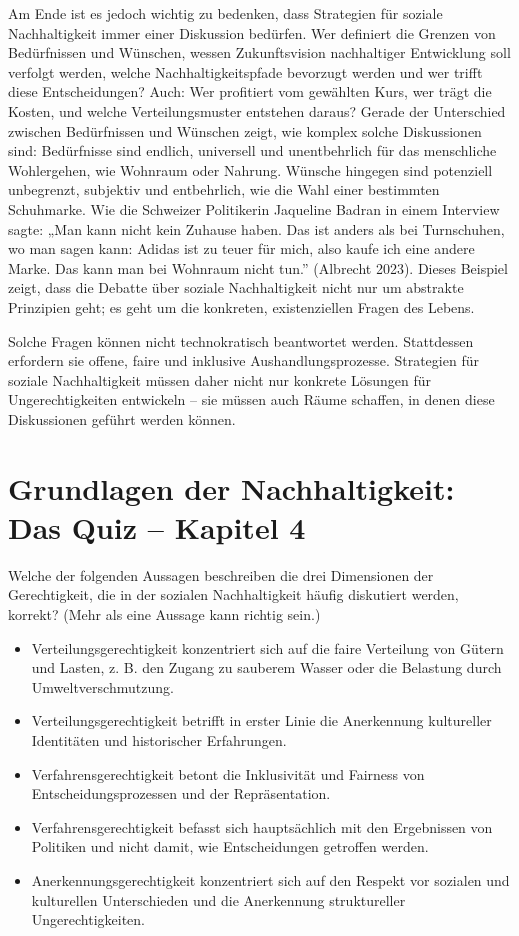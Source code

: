 \documentclass[
  nswissgerman,
  a4paper,
  openany]{book}
\providecommand{\tightlist}{%
  \setlength{\itemsep}{0pt}\setlength{\parskip}{0pt}}
\begin{document}
Am Ende ist es jedoch wichtig zu bedenken, dass Strategien für soziale
Nachhaltigkeit immer einer Diskussion bedürfen. Wer definiert die
Grenzen von Bedürfnissen und Wünschen, wessen Zukunftsvision
nachhaltiger Entwicklung soll verfolgt werden, welche
Nachhaltigkeitspfade bevorzugt werden und wer trifft diese
Entscheidungen? Auch: Wer profitiert vom gewählten Kurs, wer trägt die
Kosten, und welche Verteilungsmuster entstehen daraus? Gerade der
Unterschied zwischen Bedürfnissen und Wünschen zeigt, wie komplex solche
Diskussionen sind: Bedürfnisse sind endlich, universell und
unentbehrlich für das menschliche Wohlergehen, wie Wohnraum oder
Nahrung. Wünsche hingegen sind potenziell unbegrenzt, subjektiv und
entbehrlich, wie die Wahl einer bestimmten Schuhmarke. Wie die Schweizer
Politikerin Jaqueline Badran in einem Interview sagte: „Man kann nicht
kein Zuhause haben. Das ist anders als bei Turnschuhen, wo man sagen
kann: Adidas ist zu teuer für mich, also kaufe ich eine andere Marke.
Das kann man bei Wohnraum nicht tun.'' (Albrecht 2023). Dieses Beispiel
zeigt, dass die Debatte über soziale Nachhaltigkeit nicht nur um
abstrakte Prinzipien geht; es geht um die konkreten, existenziellen
Fragen des Lebens.

Solche Fragen können nicht technokratisch beantwortet werden.
Stattdessen erfordern sie offene, faire und inklusive
Aushandlungsprozesse. Strategien für soziale Nachhaltigkeit müssen daher
nicht nur konkrete Lösungen für Ungerechtigkeiten entwickeln -- sie
müssen auch Räume schaffen, in denen diese Diskussionen geführt werden
können.

\section{Grundlagen der Nachhaltigkeit: Das Quiz -- Kapitel
4}\label{grundlagen-der-nachhaltigkeit-das-quiz-kapitel-4}

Welche der folgenden Aussagen beschreiben die drei Dimensionen der
Gerechtigkeit, die in der sozialen Nachhaltigkeit häufig diskutiert
werden, korrekt? (Mehr als eine Aussage kann richtig sein.)

\begin{itemize}
\tightlist
\item[$\square$]
  Verteilungsgerechtigkeit konzentriert sich auf die faire Verteilung
  von Gütern und Lasten, z. B. den Zugang zu sauberem Wasser oder die
  Belastung durch Umweltverschmutzung.
\item[$\square$]
  Verteilungsgerechtigkeit betrifft in erster Linie die Anerkennung
  kultureller Identitäten und historischer Erfahrungen.
\item[$\square$]
  Verfahrensgerechtigkeit betont die Inklusivität und Fairness von
  Entscheidungsprozessen und der Repräsentation.
\item[$\square$]
  Verfahrensgerechtigkeit befasst sich hauptsächlich mit den Ergebnissen
  von Politiken und nicht damit, wie Entscheidungen getroffen werden.
\item[$\square$]
  Anerkennungsgerechtigkeit konzentriert sich auf den Respekt vor
  sozialen und kulturellen Unterschieden und die Anerkennung
  struktureller Ungerechtigkeiten.
\end{itemize}
\end{document}

